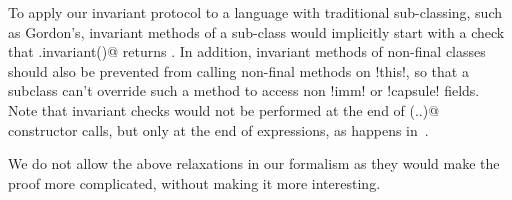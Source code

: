 To apply our invariant protocol to a language with traditional sub-classing, such as Gordon\etal's, invariant methods of a sub-class would implicitly start with a check that \Q@super.invariant()@ returns \Q@true@. In addition, invariant methods of non-final classes should also be prevented from calling non-final methods on \Q!this!, so that a subclass can't override such a method to access non \Q!imm! or \Q!capsule! fields. Note that invariant checks would not be performed at the end of \Q@super(..)@ constructor calls, but only at the end of \Q@new@ expressions, as happens in~\cite{feldman2006jose}.

We do not allow the above relaxations in our formalism as they would make the proof more complicated, without making it more interesting.